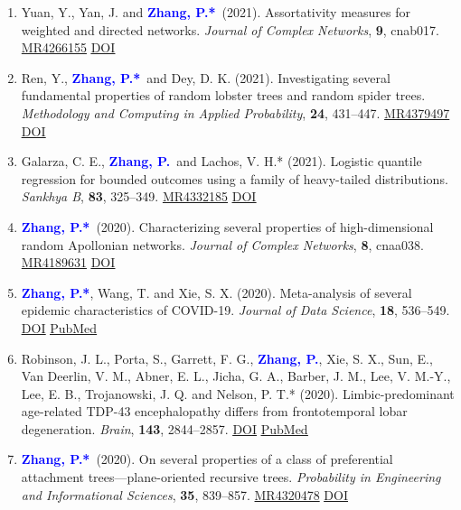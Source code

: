 \documentclass{res}
\def\MR#1{\href{http://www.ams.org/mathscinet-getitem?mr=#1}{MR#1}}
\newcommand{\PZ}{\textbf{\textcolor{blue}{Zhang, P.*}}}
\newcommand{\PZnot}{\textbf{\textcolor{blue}{Zhang, P.}}}
\begin{document}
\begin{resume}
\begin{enumerate}
	\item {\sc Yuan, Y., Yan, J.} and \PZ\ (2021). 
	Assortativity measures for weighted and directed
	networks. \emph{Journal of Complex Networks}, {\bf 9}, cnab017. 
	\MR{4266155} \href{https://doi.org/10.1093/comnet/cnab017}
	{\underline{DOI}}
	
	\item {\sc Ren, Y.}, \PZ\ and {\sc Dey, D. K.} (2021). 
	Investigating several fundamental properties of random 
	lobster trees and random spider trees. {\em Methodology and 
	Computing in Applied Probability}, {\bf 24}, 431--447. 
	\MR{4379497} \href{https://doi.org/10.1007/s11009-021-09863-9}
	{\underline{DOI}}
	
	\item {\sc Galarza, C. E.}, \PZnot\	and {\sc Lachos, V. H.*} 
	(2021). Logistic quantile regression for bounded outcomes using 
	a family of heavy-tailed distributions. {\em Sankhya B}, {\bf 
	83}, 325--349. \MR{4332185} 
	\href{https://doi.org/10.1007/s13571-020-00231-0}
	{\underline{DOI}}
	
	\item \PZ\ (2020). Characterizing several properties of 
	high-dimensional random Apollonian networks. {\em 
	Journal of Complex Networks}, {\bf 8}, cnaa038. \MR{4189631}
	\href{https://doi.org/10.1093/comnet/cnaa038}
	{\underline{DOI}}
	
	\item \PZ, {\sc Wang, T.} and {\sc Xie, S. X.} 
	(2020). Meta-analysis of several epidemic characteristics of 
	COVID-19. {\em Journal of Data Science}, {\bf 18}, 536--549. 
	\href{https://doi.org/10.6339/JDS.202007_18(3).0019}
	{\underline{DOI}}
	\href{https://pubmed.ncbi.nlm.nih.gov/33088292}
	{\underline{PubMed}}
	
	\item {\sc Robinson, J. L., Porta, S., Garrett, F. G.}, 
	\PZnot, {\sc Xie, S. X., Sun, E., 
	Van Deerlin, V. M., Abner, 
	E. L., Jicha, G. A., Barber, J. M., Lee, V. M.-Y., Lee, E. B., 
	Trojanowski, J. Q.} and {\sc Nelson, P. T.*} (2020). 
	Limbic-predominant age-related TDP-43 encephalopathy differs 
	from frontotemporal lobar degeneration. {\em Brain}, {\bf 143}, 
	2844--2857. 
	\href{https://doi.org/10.1093/brain/awaa219}
	{\underline{DOI}}
	\href{https://pubmed.ncbi.nlm.nih.gov/32830216}
	{\underline{PubMed}}
		
	\item \PZ\ (2020). On several properties of a 
	class of preferential attachment trees---plane-oriented 
	recursive trees. {\em Probability in Engineering and 
	Informational Sciences}, {\bf 35}, 839--857. \MR{4320478}
	\href{https://doi.org/10.1017/S0269964820000261}
	{\underline{DOI}}
	

\end{enumerate}
\end{resume}
\end{document}
